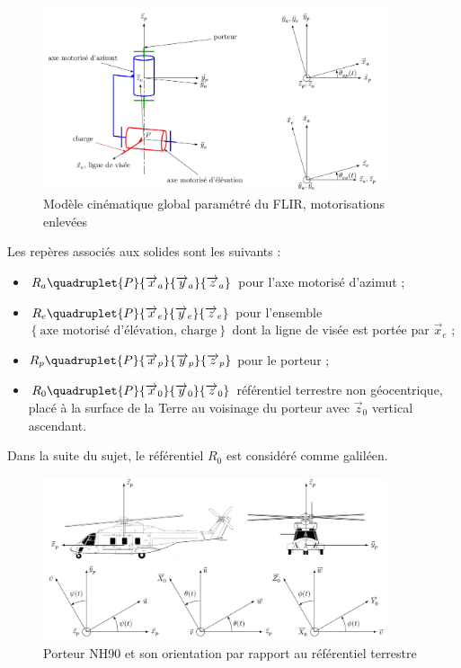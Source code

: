 \begin{figure}[!htb]
\begin{center}
\includegraphics[width=0.9\textwidth]{images/figure7.jpg}
\caption{Modèle cinématique global paramétré du FLIR, motorisations enlevées \label{figure7}}
\end{center}
\end{figure}

Les repères associés aux solides sont les suivants :
\begin{itemize}
\item $R_a\quadruplet{P}{\overrightarrow{x}_a}{\overrightarrow{y}_a}{\overrightarrow{z}_a}$ pour l'axe motorisé d'azimut ;
\item $R_e\quadruplet{P}{\overrightarrow{x}_e}{\overrightarrow{y}_e}{\overrightarrow{z}_e}$ pour l'ensemble $\left\{\text{axe motorisé d'élévation, charge}\right\}$ dont la ligne de visée est portée par $\overrightarrow{x}_e$ ;
\item $R_p\quadruplet{P}{\overrightarrow{x}_p}{\overrightarrow{y}_p}{\overrightarrow{z}_p}$ pour le porteur ;
\item $R_0\quadruplet{P}{\overrightarrow{x}_0}{\overrightarrow{y}_0}{\overrightarrow{z}_0}$ référentiel terrestre non géocentrique, placé à la surface de la Terre au voisinage du
porteur avec $\overrightarrow{z}_0$ vertical ascendant.
\end{itemize}

Dans la suite du sujet, le référentiel \textbf{$R_0$} est considéré comme galiléen.

\begin{figure}[!htb]
\begin{center}
\includegraphics[width=0.9\textwidth]{images/figure8.jpg}
\caption{Porteur NH90 et son orientation par rapport au référentiel terrestre \label{figure8}}
\end{center}
\end{figure}

